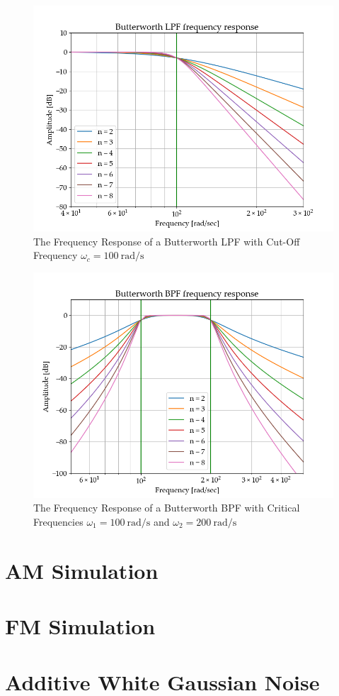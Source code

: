 \documentclass[../ECE459FinalProjectReport.tex]{subfiles}
\begin{document}
\begin{figure}[b]
    \centering
    \includegraphics[scale=0.7]{plots/butterworth-lpf.png}
    \caption{The Frequency Response of a Butterworth LPF with Cut-Off Frequency $\omega_c = \SI{100}{\radian\per\s}$}
    \label{fig:butter-lpf}
\end{figure}

\begin{figure}[b]
    \centering
    \includegraphics[scale=0.7]{plots/butterworth-bpf.png}
    \caption{The Frequency Response of a Butterworth BPF with Critical Frequencies $\omega_1 = \SI{100}{\radian\per\s}$ and $\omega_2 = \SI{200}{\radian\per\s}$}
    \label{fig:butter-bpf}
\end{figure}

\section{AM Simulation}

\section{FM Simulation}

\section{Additive White Gaussian Noise}
\end{document}
